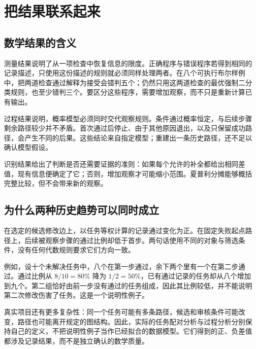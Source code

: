 \section{把结果联系起来}
\label{sec:discussion}
\subsection{数学结果的含义}
\label{subsec:implications}
测量结果说明了从一项检查中恢复信息的限度。正确程序与错误程序若得到相同的记录描述，只使用这份描述的规则就必须同样处理两者。在八个可执行布尔样例中，把两道检查通过解释为接受会错判五个；仍然只用这两道检查的最优强制二分类规则，也至少错判三个。要区分这些程序，需要增加观察，而不只是重新计算已有输出。

过程结果说明，概率模型必须同时交代观察规则。条件通过概率恒定，与后续步骤剩余路径较少并不矛盾。首次通过后停止、由于其他原因退出，以及只保留成功路径，会产生不同的后果。这些结论来自指定模型；重建出一条历史路径，还不足以确认模型假设。

识别结果给出了判断是否还需要证据的准则：如果每个允许的补全都给出相同差值，现有信息便确定了它；否则，增加观察才可能缩小范围。夏普利分摊能够概括完整比较，但不会带来新的观察。

\subsection{为什么两种历史趋势可以同时成立}
\label{subsec:two-trends}
在选定的候选修改边上，以任务等权计算的记录通过变化为正。在固定失败起点路径上，后续被观察步骤的通过比例却低于首步。两句话使用不同的对象与筛选条件，没有任何代数规则要求它们方向一致。

例如，设十个未解决任务中，八个在第一步通过，余下两个里有一个在第二步通过。通过比例从 $8/10=80\%$ 降为 $1/2=50\%$，已有通过记录的任务却从八个增加到九个。第二组恰好由前一步没有通过的任务组成，因此其比例较低，并不能说明第二次修改伤害了任务。这是一个说明性例子。

真实项目还有更多复杂性：同一个任务可能有多条路径，候选和审核条件可能改变，路径也可能离开规定的图结构。因此，实际的任务配对分析与过程分析分别保持自己的定义，不把说明性例子当作已经拟合的数据模型。它们得到的正、负差值都涉及记录结果，而不是独立确认的数学质量。

